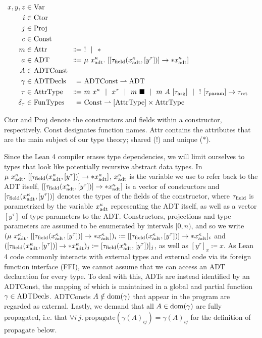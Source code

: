 \begin{alignat*}{2}
  x, y, z &\in \Var \\
  i &\in \Ctor \\
  j &\in \Proj \\
  c &\in \Const \\
  m &\in \Attr &\Coloneqq&\ ! \sep * \\
  a &\in \ADT &\Coloneqq&\ \mu\ x^\kappa_\adt.\ [[\tau_\field(x^\kappa_\adt, [y^\tau])] \to *x^\kappa_\adt] \\
  A &\in \mathrlap{\ADTConst} \\
  \gamma &\in \ADTDecls &=&\ \ADTConst \rightharpoonup \ADT \\
  \tau &\in \AttrType &\Coloneqq&\ m\ x^\kappa \sep x^\tau \sep m\ \blacksquare \sep m\ A\ [\tau_\arrg] \sep !\ [\tau_\param] \to \tau_\ret \\
  \delta_\tau &\in \FunTypes &=&\ \Const \rightharpoonup [\AttrType] \times \AttrType
\end{alignat*}

Ctor and Proj denote the constructors and fields within a constructor, respectively. Const designates function names. Attr contains the attributes that are the main subject of our type theory; shared (!) and unique ($*$). 

\sloppy Since the Lean 4 compiler erases type dependencies, we will limit ourselves to types that look like potentially recursive abstract data types. In $\mu\ x^\kappa_\adt.\ [[\tau_\field(x^\kappa_\adt, [y^\tau])] \to *x^\kappa_\adt]$, $x^\kappa_{\mathrm{adt}}$ is the variable we use to refer back to the ADT itself, $[[\tau_{\mathrm{field}}(x^\kappa_{\mathrm{adt}}, [y^\tau])] \to *x^\kappa_{\mathrm{adt}}]$ is a vector of constructors and $[\tau_{\mathrm{field}}(x^\kappa_{\mathrm{adt}}, [y^\tau])]$ denotes the types of the fields of the constructor, where $\tau_{\mathrm{field}}$ is parametrized by the variable $x^\kappa_{\mathrm{adt}}$ representing the ADT itself, as well as a vector $[y^\tau]$ of type parameters to the ADT. Constructors, projections and type parameters are assumed to be enumerated by intervals $[0, n)$, and so we write $(\mu\ x^\kappa_\adt.\ [[\tau_\field(x^\kappa_\adt, [y^\tau])] \to *x^\kappa_\adt])_i \coloneqq [[\tau_\field(x^\kappa_\adt, [y^\tau])] \to *x^\kappa_\adt]_i$ and $([\tau_{\mathrm{field}}(x^\kappa_{\mathrm{adt}}, [y^\tau])] \to *x^\kappa_{\mathrm{adt}})_j \coloneqq [\tau_{\mathrm{field}}(x^\kappa_{\mathrm{adt}}, [y^\tau])]_j$, as well as $[y^\tau]_x \coloneqq x$. As Lean 4 code commonly interacts with external types and external code via its foreign function interface (FFI), we cannot assume that we can access an ADT declaration for every type. To deal with this, ADTs are instead identified by an ADTConst, the mapping of which is maintained in a global and partial function $\gamma \in \mathrm{ADTDecls}$. ADTConsts $A \notin \mathrm{dom}(\gamma)$ that appear in the program are regarded as external. Lastly, we demand that all $A \in \mathrm{dom}(\gamma)$ are fully propagated, i.e. that $\forall i\ j.\ \mathrm{propagate}(\gamma(A)_{ij}) = \gamma(A)_{ij}$ for the definition of propagate below.

